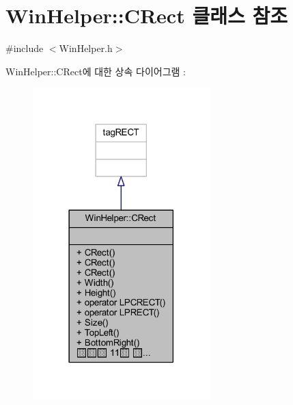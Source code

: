 \hypertarget{class_win_helper_1_1_c_rect}{}\section{Win\+Helper\+:\+:C\+Rect 클래스 참조}
\label{class_win_helper_1_1_c_rect}


{\ttfamily \#include $<$Win\+Helper.\+h$>$}



Win\+Helper\+:\+:C\+Rect에 대한 상속 다이어그램 \+: \nopagebreak
\begin{figure}[H]
\begin{center}
\leavevmode
\includegraphics[width=194pt]{class_win_helper_1_1_c_rect__inherit__graph}
\end{center}
\end{figure}


